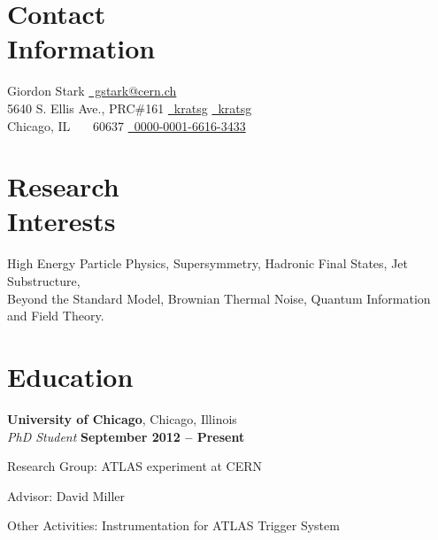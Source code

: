 \documentclass[margin,line]{resume}
\let\origsection\section%
\let\section\subsection%
\let\section\origsection%
\begin{document}
\begin{resume}

\section{\mysidestyle Contact\\Information}

Giordon Stark						\hfill \href{mailto:gstark@cern.ch}{~gstark@cern.ch}
\vspace{0mm}\\\vspace{0mm}%
5640 S. Ellis Ave., PRC\#161 \hfill \href{https://github.com/kratsg}{~kratsg} {\large\rmfamily\textbullet} \href{https://twitter.com/kratsg}{~kratsg}
\vspace{0mm}\\\vspace{0mm}%
Chicago, IL \ \ \ 60637    \hfill \href{https://orcid.org/0000-0001-6616-3433}{~0000-0001-6616-3433} \\
\vspace{-4.5mm}%

\section{\mysidestyle Research\\Interests}

High Energy Particle Physics, Supersymmetry, Hadronic Final States, Jet Substructure, \\
Beyond the Standard Model, Brownian Thermal Noise, Quantum Information and Field Theory.

    \section{\mysidestyle Education}

	\textbf{University of Chicago}, Chicago, Illinois \vspace{2mm}\\\vspace{1mm}%
	\textsl{PhD Student} \hfill \textbf{September 2012 -- Present}\vspace{-3mm}\\\vspace{-1mm}%
	\begin{list2}
		\item Research Group: ATLAS experiment at CERN
		\item Advisor: David Miller
		\item Other Activities: Instrumentation for ATLAS Trigger System
	\end{list2}\vspace{-1.5mm}


\end{resume}
\end{document}
